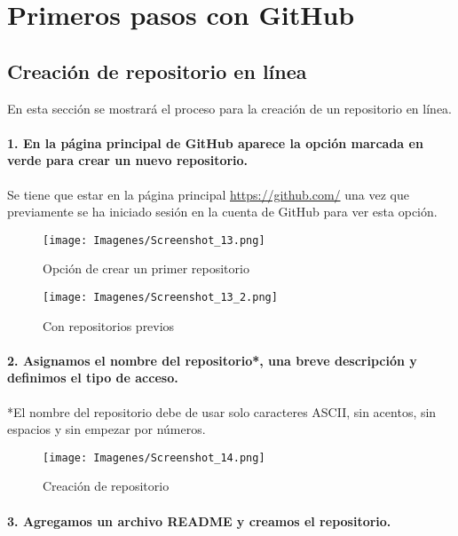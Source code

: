 \chapter{Primeros pasos con GitHub}

\section{Creación de repositorio en línea}

En esta sección se mostrará el proceso para la creación de un repositorio en línea.

\subsubsection{1. En la página principal de GitHub aparece la opción marcada en verde para crear un nuevo repositorio.}

Se tiene que estar en la página principal \href{https://github.com/}{https://github.com/} una vez que previamente se ha iniciado sesión en la cuenta de GitHub para ver esta opción.

\begin{figure}[H]
    \centering
    \texttt{[image: Imagenes/Screenshot\_13.png]}
    \caption{Opción de crear un primer repositorio}
    \label{fig:onlinerepo1}
\end{figure}

\begin{figure}[H]
    \centering
    \texttt{[image: Imagenes/Screenshot\_13\_2.png]}
    \caption{Con repositorios previos}
    \label{fig:onlinerepo1}
\end{figure}

\subsubsection{2. Asignamos el nombre del repositorio*, una breve descripción y definimos el tipo de acceso.}

*El nombre del repositorio debe de usar solo caracteres ASCII, sin acentos, sin espacios y sin empezar por números.

\begin{figure}[H]
    \centering
    \texttt{[image: Imagenes/Screenshot\_14.png]}
    \caption{Creación de repositorio}
    \label{fig:onlinerepo1}
\end{figure}

\subsubsection{3. Agregamos un archivo README y creamos el repositorio.}

